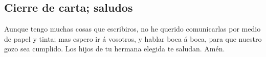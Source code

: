 \hypertarget{cierre-de-carta-saludos}{%
\subsection{Cierre de carta; saludos}\label{cierre-de-carta-saludos}}

 Aunque tengo muchas cosas que escribiros, no he querido
comunicarlas por medio de papel y tinta; mas espero ir á vosotros, y
hablar boca á boca, para que nuestro gozo sea cumplido. 
Los hijos de tu hermana elegida te saludan. Amén.
